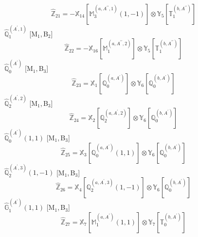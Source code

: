 \documentclass[fleqn,10pt,landscape]{article}
\begin{document}
\begin{itemize}
\begin{dmath*}
\hat{\mathbb{Z}}_{21}=- \mathbb{X}_{14}[\mathbb{M}_{3}^{(a,A^{\prime\prime},1)}(1,-1)] \otimes\mathbb{Y}_{5}[\mathbb{T}_{1}^{(b,A^{\prime\prime})}]
\end{dmath*}
\vspace{4mm}
\noindent {} $\,\,\,\hat{\mathbb{Q}}_{1}^{(A^{\prime},1)}$ [M$_{1}$,\,B$_{2}$]
\begin{dmath*}
\hat{\mathbb{Z}}_{22}=- \mathbb{X}_{16}[\mathbb{M}_{1}^{(a,A^{\prime\prime},2)}] \otimes\mathbb{Y}_{5}[\mathbb{T}_{1}^{(b,A^{\prime\prime})}]
\end{dmath*}
\vspace{4mm}
\noindent {} $\,\,\,\hat{\mathbb{Q}}_{0}^{(A^{\prime})}$ [M$_{1}$,\,B$_{3}$]
\begin{dmath*}
\hat{\mathbb{Z}}_{23}=\mathbb{X}_{1}[\mathbb{Q}_{0}^{(a,A^{\prime})}] \otimes\mathbb{Y}_{6}[\mathbb{Q}_{0}^{(b,A^{\prime})}]
\end{dmath*}
\vspace{4mm}
\noindent {} $\,\,\,\hat{\mathbb{Q}}_{2}^{(A^{\prime},2)}$ [M$_{1}$,\,B$_{3}$]
\begin{dmath*}
\hat{\mathbb{Z}}_{24}=\mathbb{X}_{2}[\mathbb{Q}_{2}^{(a,A^{\prime},2)}] \otimes\mathbb{Y}_{6}[\mathbb{Q}_{0}^{(b,A^{\prime})}]
\end{dmath*}
\vspace{4mm}
\noindent {} $\,\,\,\hat{\mathbb{Q}}_{0}^{(A^{\prime})}(1,1)$ [M$_{1}$,\,B$_{3}$]
\begin{dmath*}
\hat{\mathbb{Z}}_{25}=\mathbb{X}_{3}[\mathbb{Q}_{0}^{(a,A^{\prime})}(1,1)] \otimes\mathbb{Y}_{6}[\mathbb{Q}_{0}^{(b,A^{\prime})}]
\end{dmath*}
\vspace{4mm}
\noindent {} $\,\,\,\hat{\mathbb{Q}}_{2}^{(A^{\prime},3)}(1,-1)$ [M$_{1}$,\,B$_{3}$]
\begin{dmath*}
\hat{\mathbb{Z}}_{26}=\mathbb{X}_{4}[\mathbb{Q}_{2}^{(a,A^{\prime},3)}(1,-1)] \otimes\mathbb{Y}_{6}[\mathbb{Q}_{0}^{(b,A^{\prime})}]
\end{dmath*}
\vspace{4mm}
\noindent {} $\,\,\,\hat{\mathbb{G}}_{1}^{(A^{\prime})}(1,1)$ [M$_{1}$,\,B$_{3}$]
\begin{dmath*}
\hat{\mathbb{Z}}_{27}=\mathbb{X}_{7}[\mathbb{M}_{1}^{(a,A^{\prime})}(1,1)] \otimes\mathbb{Y}_{7}[\mathbb{T}_{0}^{(b,A^{\prime})}]
\end{dmath*}
\vspace{4mm}

\end{itemize}
\end{document}
